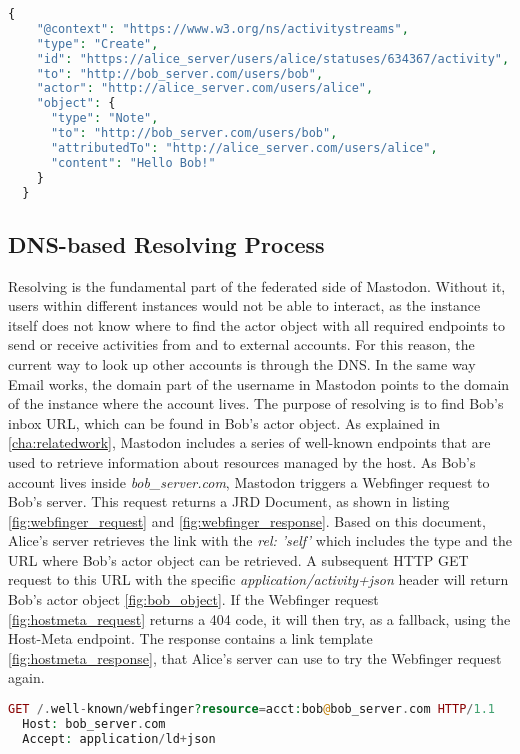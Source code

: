 \lstset{style=JSONStyle}
\begin{lstlisting}[language=PHP, caption=ActivityStreams create activity, label=fig:create_activity]
  {
    "@context": "https://www.w3.org/ns/activitystreams",
    "type": "Create",
    "id": "https://alice_server/users/alice/statuses/634367/activity",
    "to": "http://bob_server.com/users/bob",
    "actor": "http://alice_server.com/users/alice",
    "object": {
      "type": "Note",
      "to": "http://bob_server.com/users/bob",
      "attributedTo": "http://alice_server.com/users/alice",
      "content": "Hello Bob!"
    }
  }
\end{lstlisting}

\subsection{DNS-based Resolving Process}
 Resolving is the fundamental part of the federated side of Mastodon. Without it, users within different instances would not be able to interact, as the instance itself does not know where to find the actor object with all required endpoints to send or receive activities from and to external accounts. For this reason, the current way to look up other accounts is through the DNS. In the same way Email works, the domain part of the username in Mastodon points to the domain of the instance where the account lives. The purpose of resolving is to find Bob's inbox URL, which can be found in Bob's actor object. As explained in \autoref{cha:relatedwork}, Mastodon includes a series of well-known endpoints that are used to retrieve information about resources managed by the host. As Bob's account lives inside \emph{bob\_server.com}, Mastodon triggers a Webfinger request to Bob's server. This request returns a JRD Document, as shown in listing \ref{fig:webfinger_request} and \ref{fig:webfinger_response}. Based on this document, Alice's server retrieves the link with the \emph{rel: 'self'} which includes the type and the URL where Bob's actor object can be retrieved. A subsequent HTTP GET request to this URL with the specific \emph{application/activity+json} header will return Bob's actor object \ref{fig:bob_object}. If the Webfinger request \ref{fig:hostmeta_request} returns a 404 code, it will then try, as a fallback, using the Host-Meta endpoint. The response contains a link template \ref{fig:hostmeta_response}, that Alice's server can use to try the Webfinger request again.  

\begin{lstlisting}[language=PHP, caption=Webfinger request to \emph{bob\_server.com}, label=fig:webfinger_request]
  GET /.well-known/webfinger?resource=acct:bob@bob_server.com HTTP/1.1
  Host: bob_server.com
  Accept: application/ld+json
\end{lstlisting}

